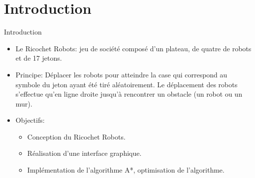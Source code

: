 \documentclass{beamer}
\begin{document}
\section{Introduction}
    \begin{frame}{Introduction}
        \begin{itemize}
            \item Le Ricochet Robots: jeu de société composé d'un plateau, de quatre de robots et de 17 jetons. 
            \vspace{0.25cm}
            \item Principe: Déplacer les robots pour atteindre la case qui correspond au symbole du jeton ayant été tiré aléatoirement.
             Le déplacement des robots s'effectue qu'en ligne droite jusqu'à rencontrer un obstacle (un robot ou un mur).
            
            \vspace{0.25cm}
            
            \item Objectifs: 
            \begin{itemize}
                \item Conception du Ricochet Robots.
                \item Réalisation d'une interface graphique.
                \item Implémentation de l'algorithme A*, optimisation de l'algorithme.
            \end{itemize}
        \end{itemize}
    \end{frame}
\end{document}
